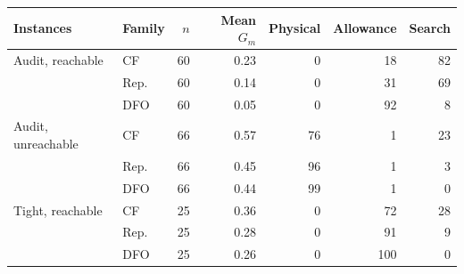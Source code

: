 \begin{tabular}{@{}llrrrrr@{}}
\toprule
Instances & Family & $n$ & Mean $G_m$ & Physical & Allowance & Search \\
\midrule
Audit, reachable & CF & 60 & 0.23 & 0 & 18 & 82 \\
 & Rep. & 60 & 0.14 & 0 & 31 & 69 \\
 & DFO & 60 & 0.05 & 0 & 92 & 8 \\
\midrule
Audit, unreachable & CF & 66 & 0.57 & 76 & 1 & 23 \\
 & Rep. & 66 & 0.45 & 96 & 1 & 3 \\
 & DFO & 66 & 0.44 & 99 & 1 & 0 \\
\midrule
Tight, reachable & CF & 25 & 0.36 & 0 & 72 & 28 \\
 & Rep. & 25 & 0.28 & 0 & 91 & 9 \\
 & DFO & 25 & 0.26 & 0 & 100 & 0 \\
\bottomrule
\end{tabular}
